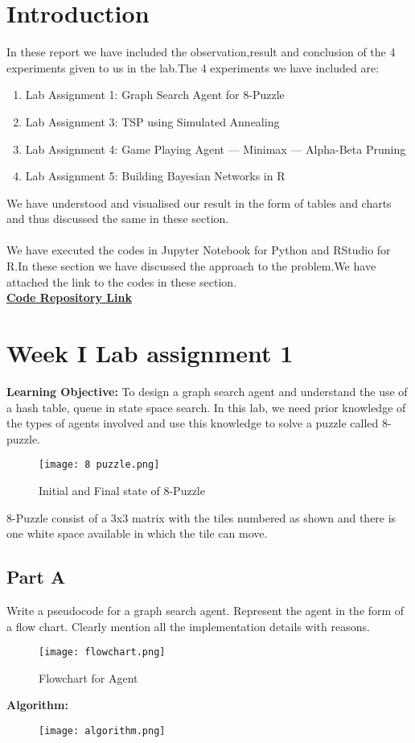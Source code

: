 \documentclass[conference]{IEEEtran}
\begin{document}
\section{Introduction}
In these report we have included the observation,result and conclusion of the 4 experiments given to us in the lab.The 4 experiments we have included are:
\begin{enumerate}
    \item  Lab Assignment 1: Graph Search Agent for 8-Puzzle
    \item  Lab Assignment 3: TSP using Simulated Annealing
    \item  Lab Assignment 4: Game Playing Agent — Minimax
— Alpha-Beta Pruning
    \item Lab Assignment 5: Building Bayesian Networks in R
\end{enumerate}
We have understood and visualised our result in the form of tables and charts and thus discussed the same in these section.
\\
\\
We have executed the codes in Jupyter Notebook for Python and RStudio for R.In these section we have discussed the approach to the problem.We have attached the link to the codes in these section.
\\
\textbf{\href{https://github.com/darshh311/CS362_lab}{Code Repository Link}}


\section{Week I Lab assignment 1 }
\textbf{Learning Objective:}
To design a graph search agent and understand the use of a hash table, queue in state space search. In this lab, we need prior knowledge of the types of agents
involved and use this knowledge to solve a puzzle called 8-puzzle.
\begin{figure}[htbp]
\centerline{\texttt{[image: 8 puzzle.png]}}
\caption{Initial and Final state of 8-Puzzle \cite{b2}}
\label{fig}
\end{figure}
8-Puzzle consist of a 3x3 matrix with the tiles numbered as shown and there is one white space available in which the tile can move.
\subsection{Part A}
Write a pseudocode for a graph search agent. Represent
the agent in the form of a flow chart. Clearly mention all the
implementation details with reasons.
\begin{figure}[htbp]
\centerline{\texttt{[image: flowchart.png]}}
\caption{Flowchart for Agent}
\label{fig}
\end{figure}
\newline
\textbf{Algorithm:}
\begin{figure}[htbp]
\centerline{\texttt{[image: algorithm.png]}}
\end{figure}
\end{document}
